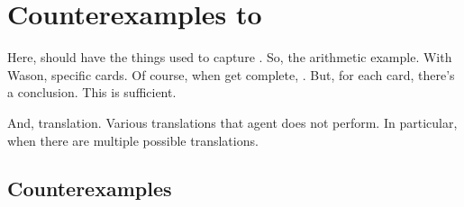 \chapter{Counterexamples to \issueInclusion{}}
\label{cha:ces}


\begin{note}
  Here, should have the things used to capture \tCV{}.
  So, the arithmetic example.
  With Wason, specific cards.
  Of course, when get complete, \wit{}.
  But, for each card, there's a conclusion.
  This is sufficient.

  And, translation.
  Various translations that agent does not perform.
  In particular, when there are multiple possible translations.
\end{note}




\section{Counterexamples}
\label{sec:counterexamples}


